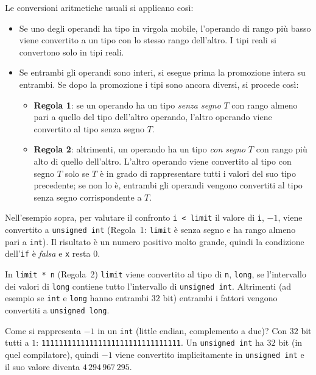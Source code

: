 \documentclass[11pt,a4paper]{article}
\begin{document}
Le conversioni aritmetiche usuali si applicano così:
\begin{itemize}
    \item Se uno degli operandi ha tipo in virgola mobile, l'operando di rango più basso viene convertito a un tipo con lo stesso rango dell'altro. I tipi reali si convertono solo in tipi reali.
    \item Se entrambi gli operandi sono interi, si esegue prima la promozione intera su entrambi. Se dopo la promozione i tipi sono ancora diversi, si procede così:
    \begin{itemize}
        \item \textbf{Regola 1}: se un operando ha un tipo \emph{senza segno} $T$ con rango almeno pari a quello del tipo dell'altro operando, l'altro operando viene convertito al tipo senza segno $T$.
        \item \textbf{Regola 2}: altrimenti, un operando ha un tipo \emph{con segno} $T$ con rango più alto di quello dell'altro. L'altro operando viene convertito al tipo con segno $T$ solo se $T$ è in grado di rappresentare tutti i valori del suo tipo precedente; se non lo è, entrambi gli operandi vengono convertiti al tipo senza segno corrispondente a $T$.
    \end{itemize}
\end{itemize}

\begin{esempio}
Nell'esempio sopra, per valutare il confronto \lstinline|i < limit| il valore di \lstinline|i|, $-1$, viene convertito a \lstinline|unsigned int| (Regola~1: \lstinline|limit| è senza segno e ha rango almeno pari a \lstinline|int|). Il risultato è un numero positivo molto grande, quindi la condizione dell'\lstinline|if| è \emph{falsa} e \lstinline|x| resta $0$.

In \lstinline|limit * n| (Regola~2) \lstinline|limit| viene convertito al tipo di \lstinline|n|, \lstinline|long|, se l'intervallo dei valori di \lstinline|long| contiene tutto l'intervallo di \lstinline|unsigned int|. Altrimenti (ad esempio se \lstinline|int| e \lstinline|long| hanno entrambi $32$ bit) entrambi i fattori vengono convertiti a \lstinline|unsigned long|.

Come si rappresenta $-1$ in un \lstinline|int| (little endian, complemento a due)? Con $32$ bit tutti a $1$: \texttt{11111111111111111111111111111111}. Un \lstinline|unsigned int| ha $32$ bit (in quel compilatore), quindi $-1$ viene convertito implicitamente in \lstinline|unsigned int| e il suo valore diventa $4\,294\,967\,295$.
\end{esempio}
\end{document}
